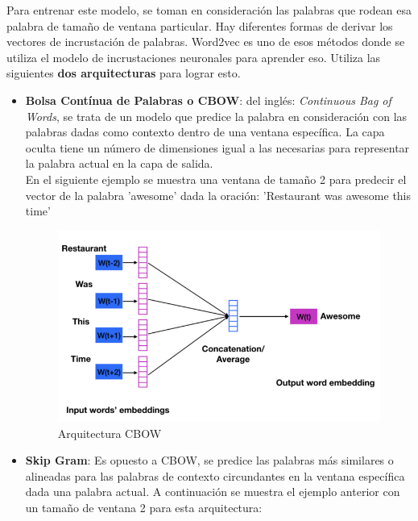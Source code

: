 \documentclass[a4paper,12pt]{report}
\begin{document}
Para entrenar este modelo, se toman en consideración las palabras que rodean esa palabra de tamaño de ventana particular. Hay diferentes formas de derivar los vectores de incrustación de palabras. Word2vec es uno de esos métodos donde se utiliza el modelo de incrustaciones neuronales para aprender eso. Utiliza las siguientes \textbf{dos arquitecturas} para lograr esto.

\begin{itemize}

\item \textbf{Bolsa Contínua de Palabras o CBOW}: del inglés: \textit{Continuous Bag of Words}, se trata de un modelo que predice la palabra en consideración con las palabras dadas como contexto dentro de una ventana específica. La capa oculta tiene un número de dimensiones igual a las necesarias para representar la palabra actual en la capa de salida. 
\vspace{2mm}\\
En el siguiente ejemplo se muestra una ventana de tamaño 2 para predecir el vector de la palabra 'awesome' dada la oración: 'Restaurant was awesome this time’


\vspace{4mm}
\begin{figure}[htbp!]
\centering
\includegraphics[scale=0.4]{images/cbow.png}
\caption{Arquitectura CBOW}
\end{figure}
\vspace{2mm}


\item \textbf{Skip Gram}: Es opuesto a CBOW, se predice las palabras más similares o alineadas para las palabras de contexto circundantes en la ventana específica dada una palabra actual.
A continuación se muestra el ejemplo anterior con un tamaño de ventana 2 para esta arquitectura:


\end{itemize}
\end{document}
